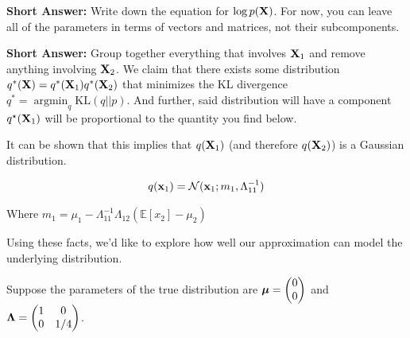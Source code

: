 \documentclass[11pt,addpoints,answers]{exam}
\numberwithin{equation}{section} %
\numberwithin{figure}{section} %
\numberwithin{table}{section} %
\newcommand \argmin {\operatorname*{argmin}}
\begin{document}
\begin{questions}
\question[1] \textbf{Short Answer:} Write down the equation for $\log p(\mathbf{X})$. For now, you can leave all of the parameters in terms of vectors and matrices, not their subcomponents. 

\begin{tcolorbox}[fit,height=2cm, width=15cm, blank, borderline={1pt}{-2pt}]
\end{tcolorbox}

\question[2] \textbf{Short Answer:} Group together everything that involves $\mathbf{X}_1$ and remove anything involving $\mathbf{X}_2$. We claim that there exists some distribution $q^*(\mathbf{X}) = q^*(\mathbf{X}_1)q^*(\mathbf{X}_2)$ that minimizes the KL divergence  $q^* = \argmin_{q} \text{KL}(q || p)$. And further, said distribution will have a component $q^\star(\mathbf{X}_1)$ will be proportional to the quantity you find below.  

\begin{tcolorbox}[fit,height=2cm, width=15cm, blank, borderline={1pt}{-2pt}]
\end{tcolorbox}

It can be shown that this implies that $q(\mathbf{X}_1)$ (and therefore $q(\mathbf{X}_2)$) is a Gaussian distribution. 

\begin{equation*}
    q(\mathbf{x}_1) = \mathcal{N}(\mathbf{x}_1; m_1, \Lambda_{11}^{-1})
\end{equation*}

Where $m_1 = \mu_1 - \Lambda_{11}^{-1}\Lambda_{12}(\mathbb{E}[x_2]-\mu_2)$

Using these facts, we'd like to explore how well our approximation can model the underlying distribution. 

\question Suppose the parameters of the true distribution are $\boldsymbol \mu = \begin{pmatrix} 0 \\ 0 \end{pmatrix}$ and $\boldsymbol \Lambda = \begin{pmatrix} 1 & 0 \\ 0 & 1/4 \end{pmatrix}$. 

\end{questions}
\end{document}
